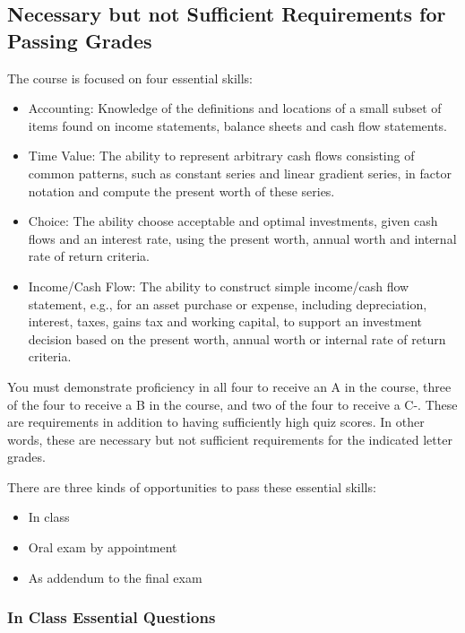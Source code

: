 \documentclass[letterpaper,10pt]{article}
\begin{document}
 \subsection{ Necessary but not Sufficient Requirements for Passing Grades}\label{sec:essentialSkills}
 

 The course is focused on four essential skills:
 
 \begin{itemize}
 
 \item Accounting: Knowledge of the definitions and locations of a
   small subset of items found on income statements, balance sheets and
   cash flow statements.
 
 \item Time Value: The ability to represent arbitrary cash flows
   consisting of common patterns, such as constant series and linear
   gradient series, in factor notation and compute the present worth of
   these series.
 
 \item Choice: The ability choose acceptable and optimal investments,
   given cash flows and an interest rate, using the present worth,
   annual worth and internal rate of return criteria.
 
 \item Income/Cash Flow: The ability to construct simple income/cash
   flow statement, e.g., for an asset purchase or expense, including
   depreciation, interest, taxes, gains tax and working capital, to
   support an investment decision based on the present worth, annual
   worth or internal rate of return criteria.
 \end{itemize}
 

You must demonstrate proficiency in all four to receive an A in the course, three of the four to receive a B in the course, and two of the four to receive a C-.  These are requirements in addition to having sufficiently high quiz scores.  In other words, these are necessary but not sufficient requirements for the indicated letter grades.

There are three kinds of opportunities to pass these essential skills:
\begin{itemize}
    \item In class
    \item Oral exam by appointment
    \item As addendum to the final exam
\end{itemize}

 
\subsubsection{In Class Essential Questions}
\end{document}
